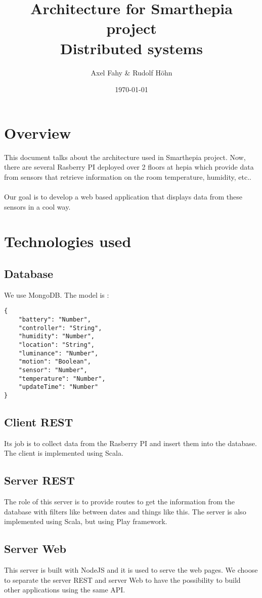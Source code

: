 \documentclass[a4paper]{article}
\title{Architecture for Smarthepia project\\Distributed systems}
\author{Axel Fahy \& Rudolf Höhn}
\date{\today}
\begin{document}
\maketitle

\section{Overview}
This document talks about the architecture used in Smarthepia project. Now, there are several Rasberry PI deployed over 2 floors at hepia which provide data from sensors that retrieve information on the room temperature, humidity, etc.. \\\\
Our goal is to develop a web based application that displays data from these sensors in a cool way.

\section{Technologies used}
\subsection{Database}
We use MongoDB. The model is :
\begin{verbatim}
{
    "battery": "Number",
    "controller": "String",
    "humidity": "Number",
    "location": "String",
    "luminance": "Number",
    "motion": "Boolean",
    "sensor": "Number",
    "temperature": "Number",
    "updateTime": "Number"
}
\end{verbatim}
\subsection{Client REST}
Its job is to collect data from the Rasberry PI and insert them into the database. The client is implemented using Scala.
\subsection{Server REST}
The role of this server is to provide routes to get the information from the database with filters like between dates and things like this.
The server is also implemented using Scala, but using Play framework.
\subsection{Server Web}
This server is built with NodeJS and it is used to serve the web pages. We choose to separate the server REST and server Web to have the possibility to build other applications using the same API.
\end{document}
